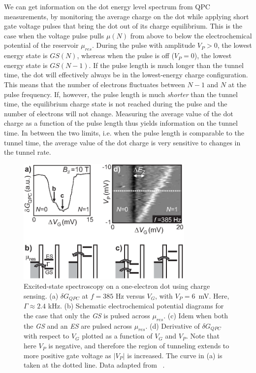 \documentclass[12pt,aps,nofootinbib]{revtex4-1}
\begin{document}
We can get information on the dot energy level spectrum from QPC measurements, by monitoring the average charge on the
dot while applying short gate voltage pulses that bring the dot
out of its charge equilibrium. This is the case when the voltage
pulse pulls $\mu(N)$ from above to below the electrochemical
potential of the reservoir $\mu_{res}$. During the pulse with
amplitude $V_P>0$, the lowest energy state is $GS(N)$, whereas
when the pulse is off ($V_P=0$), the lowest energy state is
$GS(N-1)$. If the pulse length is much longer than the tunnel
time, the dot will effectively always be in the lowest-energy
charge configuration. This means that the number of electrons
fluctuates between $N-1$ and $N$ at the pulse frequency. If,
however, the pulse length is much \textit{shorter} than the tunnel
time, the equilibrium charge state is not reached during the pulse
and the number of electrons will not change. Measuring the average
value of the dot charge as a function of the pulse length thus
yields information on the tunnel time. In between the two limits,
i.e. when the pulse length is comparable to the tunnel time, the
average value of the dot charge is very sensitive to changes in
the tunnel rate.

\begin{figure}[htb]
\includegraphics[width=3.4in]{hanson_fig12.eps}
\caption{Excited-state spectroscopy on a one-electron dot using
charge sensing. (a) $\delta G_{QPC}$ at $f = 385$ Hz versus $V_G$,
with $V_{P} = 6$~mV. Here, $\Gamma \approx 2.4$ kHz. (b) Schematic
electrochemical potential diagrams for the case that only the
\textit{GS} is pulsed across $\mu_{res}$. (c) Idem when both the
\textit{GS} and an \textit{ES} are pulsed across $\mu_{res}$. (d)
Derivative of $\delta G_{QPC}$ with respect to $V_G$ plotted as a
function of $V_G$ and $V_P$. Note that here $V_P$ is negative, and
therefore the region of tunneling extends to more positive gate
voltage as $|V_P|$ is increased. The curve in (a) is taken at the
dotted line. Data adapted from ~\textcite{ElzermanAPL2004}.}
\label{fig:ZeemanCharge}
\end{figure}
\end{document}
